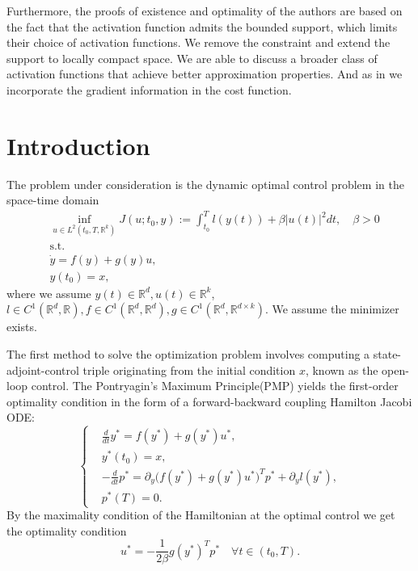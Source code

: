 \documentclass[12pt,fleqn]{amsart}
\theoremstyle{definition}
\begin{document}
Furthermore, the proofs of existence and optimality of the authors are based on the fact that the activation function admits the bounded support, which limits their choice of activation functions. 
We remove the constraint and extend the support to locally compact space. We are able to discuss a broader class of activation functions that achieve better approximation properties. 
And as in \cite{azmi2021optimal} we incorporate the gradient information in the cost function.\par  

 
\section{Introduction}
The problem under consideration is the dynamic optimal control problem in the space-time domain
\begin{equation}
\label{opt}
\tag{$P$}
\begin{aligned}
	&\inf_{u \in L^2(t_0, T, \mathbb{R}^k)} J(u; t_0, y):= \int_{t_0}^T l(y(t)) + \beta |u(t)|^2 dt, \quad \beta >0\\
	&\text{s.t.}\\
	& \dot{y} = f(y) + g(y) u,\\
	& y(t_0) = x,
\end{aligned}
\end{equation}
where we assume $y(t) \in \mathbb{R}^d, u(t) \in \mathbb{R}^k$, $l \in C^1(\mathbb{R}^d, \mathbb{R}), f \in C^1(\mathbb{R}^d, \mathbb{R}^d), g \in C^1(\mathbb{R}^d, \mathbb{R}^{d \times k})$. We assume the minimizer exists.\par

The first method to solve the optimization problem involves computing a state-adjoint-control triple originating from the initial condition $x$, known as the open-loop control. The Pontryagin's Maximum Principle(PMP) yields the first-order optimality condition in the form of a forward-backward coupling Hamilton Jacobi ODE:
\begin{equation}
\label{TPBVP}
\tag{TPBVP}
\left\{
\begin{aligned}
	&\frac{d}{dt}y^* = f(y^*) + g(y^*)u^*,\\
	& y^*(t_0) = x, \\
	& -\frac{d}{dt} p^* = \partial_y \bigg( f(y^*) +  g(y^*) u^* \bigg)^Tp^* + \partial_y l(y^*),\\
	& p^*(T) = 0.
\end{aligned}
\right.
\end{equation}
By the maximality condition of the Hamiltonian at the optimal control we get the optimality condition
\begin{equation}
	u^* = - \frac{1}{2\beta} g(y^*)^T p^* \quad \forall t \in (t_0, T). 
\end{equation}
\end{document}
